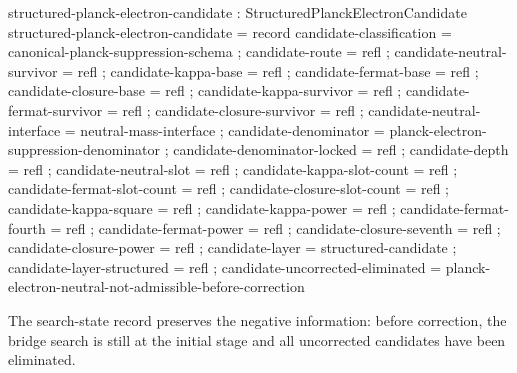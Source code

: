 \documentclass[11pt]{article}
\begin{document}
\begin{code}
structured-planck-electron-candidate : StructuredPlanckElectronCandidate
structured-planck-electron-candidate = record
  { candidate-classification    = canonical-planck-suppression-schema
  ; candidate-route             = refl
  ; candidate-neutral-survivor  = refl
  ; candidate-kappa-base        = refl
  ; candidate-fermat-base       = refl
  ; candidate-closure-base      = refl
  ; candidate-kappa-survivor    = refl
  ; candidate-fermat-survivor   = refl
  ; candidate-closure-survivor  = refl
  ; candidate-neutral-interface = neutral-mass-interface
  ; candidate-denominator       = planck-electron-suppression-denominator
  ; candidate-denominator-locked = refl
  ; candidate-depth             = refl
  ; candidate-neutral-slot      = refl
  ; candidate-kappa-slot-count  = refl
  ; candidate-fermat-slot-count = refl
  ; candidate-closure-slot-count = refl
  ; candidate-kappa-square      = refl
  ; candidate-kappa-power       = refl
  ; candidate-fermat-fourth     = refl
  ; candidate-fermat-power      = refl
  ; candidate-closure-seventh   = refl
  ; candidate-closure-power     = refl
  ; candidate-layer             = structured-candidate
  ; candidate-layer-structured  = refl
  ; candidate-uncorrected-eliminated = planck-electron-neutral-not-admissible-before-correction
  }
\end{code}

The search-state record preserves the negative information: before correction,
the bridge search is still at the initial stage and all uncorrected candidates
have been eliminated.

\end{document}
